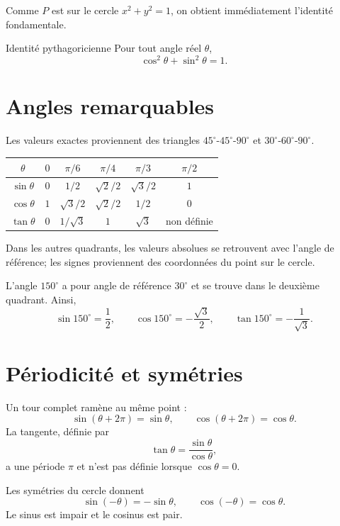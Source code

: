 \documentclass[12pt,a4paper,openany]{book}
\begin{document}
Comme $P$ est sur le cercle $x^2+y^2=1$, on obtient immédiatement l'identité fondamentale.

\begin{theorem}{Identité pythagoricienne}{}
Pour tout angle réel $\theta$,
\[
\cos^2\theta+\sin^2\theta=1.
\]
\end{theorem}

\section{Angles remarquables}

Les valeurs exactes proviennent des triangles $45^\circ$-$45^\circ$-$90^\circ$ et $30^\circ$-$60^\circ$-$90^\circ$.

\begin{center}
\begin{tabular}{c|ccccc}
\toprule
$\theta$ & $0$ & $\pi/6$ & $\pi/4$ & $\pi/3$ & $\pi/2$ \\
\midrule
$\sin\theta$ & $0$ & $1/2$ & $\sqrt2/2$ & $\sqrt3/2$ & $1$ \\
$\cos\theta$ & $1$ & $\sqrt3/2$ & $\sqrt2/2$ & $1/2$ & $0$ \\
$\tan\theta$ & $0$ & $1/\sqrt3$ & $1$ & $\sqrt3$ & non définie \\
\bottomrule
\end{tabular}
\end{center}

Dans les autres quadrants, les valeurs absolues se retrouvent avec l'angle de référence; les signes proviennent des coordonnées du point sur le cercle.

\begin{examplebox}
L'angle $150^\circ$ a pour angle de référence $30^\circ$ et se trouve dans le deuxième quadrant. Ainsi,
\[
\sin150^\circ=\frac12,
\qquad
\cos150^\circ=-\frac{\sqrt3}{2},
\qquad
\tan150^\circ=-\frac1{\sqrt3}.
\]
\end{examplebox}

\section{Périodicité et symétries}

Un tour complet ramène au même point :
\[
\sin(\theta+2\pi)=\sin\theta,
\qquad
\cos(\theta+2\pi)=\cos\theta.
\]
La tangente, définie par
\[
\tan\theta=\frac{\sin\theta}{\cos\theta},
\]
a une période $\pi$ et n'est pas définie lorsque $\cos\theta=0$.

Les symétries du cercle donnent
\[
\sin(-\theta)=-\sin\theta,
\qquad
\cos(-\theta)=\cos\theta.
\]
Le sinus est impair et le cosinus est pair.
\end{document}
